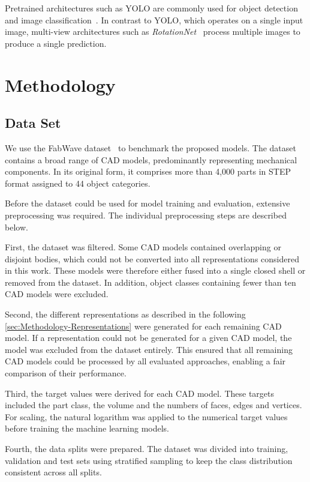 \documentclass[5p,times,procedia]{elsarticle}
\begin{document}
Pretrained architectures such as YOLO are commonly used for object detection and image classification~\cite{redmon2016you}.
In contrast to YOLO, which operates on a single input image, multi-view architectures such as \textit{RotationNet}~\cite{kanezaki2018rotationnet} process multiple images to produce a single prediction.

\section{Methodology}\label{sec:Methodology}
\subsection{Data Set}\label{sec:Methodology-Data-Set}
We use the FabWave dataset~\cite{starly2019fabwave} to benchmark the proposed models.
The dataset contains a broad range of CAD models, predominantly representing mechanical components.
In its original form, it comprises more than 4,000 parts in STEP format assigned to 44 object categories.

Before the dataset could be used for model training and evaluation, extensive preprocessing was required.
The individual preprocessing steps are described below. 

First, the dataset was filtered.
Some CAD models contained overlapping or disjoint bodies, which could not be converted into all representations considered in this work.
These models were therefore either fused into a single closed shell or removed from the dataset.
In addition, object classes containing fewer than ten CAD models were excluded. 

Second, the different representations as described in the following \cref{sec:Methodology-Representations} were generated for each remaining CAD model.
If a representation could not be generated for a given CAD model, the model was excluded from the dataset entirely.
This ensured that all remaining CAD models could be processed by all evaluated approaches, enabling a fair comparison of their performance.

Third, the target values were derived for each CAD model.
These targets included the part class, the volume and the numbers of faces, edges and vertices. 
For scaling, the natural logarithm was applied to the numerical target values before training the machine learning models.

Fourth, the data splits were prepared. The dataset was divided into training, validation and test sets using stratified sampling to keep the class distribution consistent across all splits.
\end{document}
